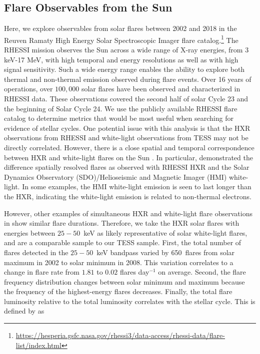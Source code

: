 \documentclass[twocolumn]{aastex631}
\begin{document}
\subsection{Flare Observables from the Sun}

Here, we explore observables from solar flares between 2002 and 2018 in the Reuven
Ramaty High Energy Solar Spectroscopic Imager \citep[RHESSI;][]{lin02} flare
catalog.\footnote{\url{https://hesperia.gsfc.nasa.gov/rhessi3/data-access/rhessi-data/flare-list/index.html}}
The RHESSI mission observes the Sun across a wide range of X-ray energies,
from 3 keV-17 MeV, with high temporal and energy resolutions as well as with high signal
sensitivity. Such a wide energy range enables the ability to explore both thermal and
non-thermal emission observed during flare events. Over 16 years of operations, over
$100,000$ solar flares have been observed and characterized in RHESSI data. These
observations covered the second half of solar Cycle 23 and the beginning of Solar
Cycle 24. We use the publicly available RHESSI flare catalog to determine  metrics
that would be most useful when searching for evidence of stellar cycles. One potential
issue with this analysis is that the HXR observations from RHESSI and white-light
observations from TESS may not be directly correlated. However, there is a close spatial
and temporal correspondence between HXR and white-light flares on the Sun
\citep{fletcher07, krucker11, kleint16}. In particular, \cite{namekata17}
demonstrated the difference spatially resolved flares as observed with RHESSI HXR and the
Solar Dynamics Observatory (SDO)/Helioseismic and Magnetic Imager (HMI) white-light. In
some examples, the HMI white-light emission is seen to last longer than the HXR,
indicating the white-light emission is related to non-thermal electrons.

However, other examples of simultaneous HXR and white-light flare
observations in \citep{namekata17} show similar flare durations. Therefore, we take
the HXR solar flares with energies between $25 - 50$~keV as likely representative
of solar white-light flares, and are a comparable sample to our TESS sample. First,
the total number of flares detected in the $25 - 50$~keV bandpass varied by 650~flares
from solar maximum in 2002 to solar minimum in 2008. This variation correlates to
a change in flare rate from $1.81$ to $0.02$ flares day$^{-1}$ on average. Second,
the flare frequency distribution changes between solar minimum and maximum because
the frequency of the highest-energy flares decreases.  Finally, the total flare
luminosity relative to the total luminosity correlates with the stellar cycle.
This is defined by \cite{lurie15} as
\end{document}
